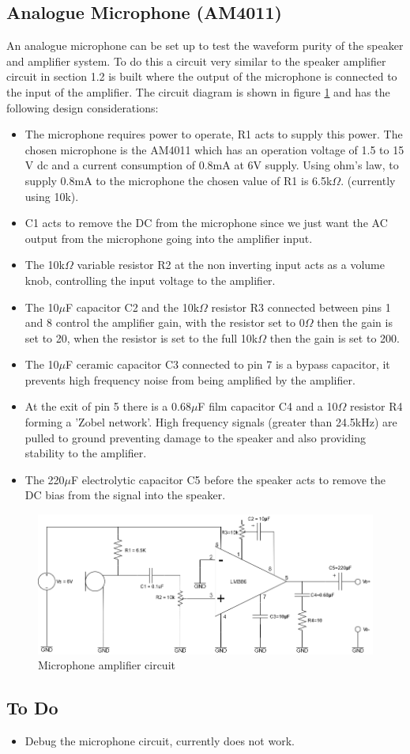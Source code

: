 \documentclass[12pt, a4paper]{article}
\begin{document}
\subsection{Analogue Microphone (AM4011)}
An analogue microphone can be set up to test the waveform purity of the speaker and amplifier system. To do this a circuit very similar to the speaker amplifier circuit in section 1.2 is built where the output of the microphone is connected to the input of the amplifier. The circuit diagram is shown in figure \ref{fig:microphoneAmplifier} and has the following design considerations:
\begin{itemize}
	\item The microphone requires power to operate, R1 acts to supply this power. The chosen microphone is the AM4011 which has an operation voltage of 1.5 to 15 V dc and a current consumption of 0.8mA at 6V supply. Using ohm's law, to supply 0.8mA to the microphone the chosen value of R1 is 6.5k$\Omega$. (currently using 10k).
	\item C1 acts to remove the DC from the microphone since we just want the AC output from the microphone going into the amplifier input.
	\item The 10k$\Omega$ variable resistor R2 at the non inverting input acts as a volume knob, controlling the input voltage to the amplifier.
	\item The 10$\mu$F capacitor C2 and the 10k$\Omega$ resistor R3 connected between pins 1 and 8 control the amplifier gain, with the resistor set to 0$\Omega$ then the gain is set to 20, when the resistor is set to the full 10k$\Omega$ then the gain is set to 200.
	\item The 10$\mu$F ceramic capacitor C3 connected to pin 7 is a bypass capacitor, it prevents high frequency noise from being amplified by the amplifier. 
	\item At the exit of pin 5 there is a 0.68$\mu$F film capacitor C4 and a 10$\Omega$ resistor R4 forming a 'Zobel network'. High frequency signals (greater than 24.5kHz) are pulled to ground preventing damage to the speaker and also providing stability to the amplifier.
	\item The 220$\mu$F electrolytic capacitor C5 before the speaker acts to remove the DC bias from the signal into the speaker. 
\end{itemize}
\begin{figure}[!htb]
	\includegraphics[width=\textwidth]{./Figures/Analogue_Microphone_Circuit}	
	\caption{Microphone amplifier circuit}
	\label{fig:microphoneAmplifier}
\end{figure}
\subsection{To Do}
\begin{itemize}
	\item Debug the microphone circuit, currently does not work.
\end{itemize}
\printbibliography[title={References}]
\end{document}
